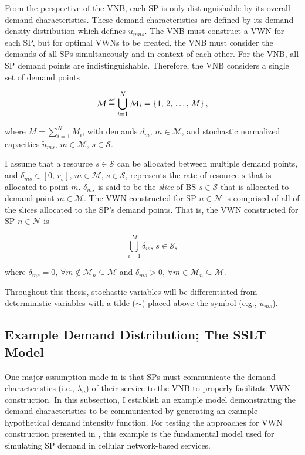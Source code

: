 \documentclass[12pt,dvipsnames]{report}
\newcommand\defeq{\mathrel{\overset{\makebox[0pt]{\mbox{\normalfont\tiny\sffamily def}}}{=}}}
\begin{document}
From the perspective of the VNB, each SP is only distinguishable by its overall demand characteristics.  These demand characteristics are defined by its demand density distribution which defines $\tilde{u}_{mns}$.  The VNB must construct a VWN for each SP, but for optimal VWNs to be created, the VNB must consider the demands of all SPs simultaneously and in context of each other.  For the VNB, all SP demand points are indistinguishable.  Therefore, the VNB considers a single set of demand points

\begin{equation}
\mathcal{M} \defeq \bigcup_{i=1}^N \mathcal{M}_i = \left\{ 1,\, 2,\, \ldots,\, M \right\},
\end{equation}

\noindent where $M = \sum_{i=1}^N M_i$, with demands $d_m,\, m \in \mathcal{M}$, and stochastic normalized capacities $\tilde{u}_{ms},\, m \in \mathcal{M},\, s \in \mathcal{S}$.

I assume that a resource $s \in \mathcal{S}$ can be allocated between multiple demand points, and $\delta_{ms} \in [0,\, r_s],\, m \in \mathcal{M},\, s \in \mathcal{S}$, represents the rate of resource $s$ that is allocated to point $m$.  $\delta_{ms}$ is said to be the \emph{slice} of BS $s \in \mathcal{S}$ that is allocated to demand point $m \in \mathcal{M}$.  The VWN constructed for SP $n \in \mathcal{N}$ is comprised of all of the slices allocated to the SP's demand points.  That is, the VWN constructed for SP $n \in \mathcal{N}$ is 

\begin{equation}
\bigcup_{i=1}^{M} \delta_{is},\, s \in \mathcal{S},
\end{equation}

\noindent where $\delta_{ms} = 0,\, \forall m \not\in \mathcal{M}_n \subseteq \mathcal{M}$ and $\delta_{ms} > 0,\, \forall m \in \mathcal{M}_n \subseteq \mathcal{M}$.

Throughout this thesis, stochastic variables will be differentiated from deterministic variables with a tilde ($\sim$) placed above the symbol (e.g., $\tilde{u}_{ms}$).

\subsection{Example Demand Distribution; The SSLT Model} \label{subsec:networkdefs_sslt}

One major assumption made in  is that SPs must communicate the demand characteristics (i.e., $\lambda_n$) of their service to the VNB to properly facilitate VWN construction.  In this subsection, I establish an example model demonstrating the demand characteristics to be communicated by generating an example hypothetical demand intensity function.  For testing the approaches for VWN construction presented in , this example is the fundamental model used for simulating SP demand in cellular network-based services.
\end{document}
